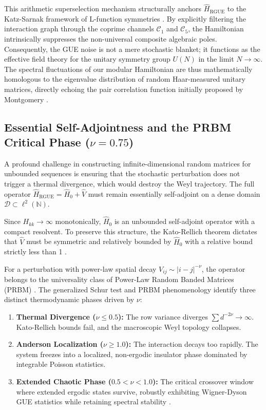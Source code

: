\documentclass[prl,aps,floatfix,superscriptaddress,10pt]{revtex4-2}
\newcommand{\N}{\mathbb{N}}
\begin{document}
This arithmetic superselection mechanism structurally anchors $\hat{H}_{\text{RGUE}}$ to the Katz-Sarnak framework of L-function symmetries \cite{KatzSarnak1999}. By explicitly filtering the interaction graph through the coprime channels $\mathcal{C}_1$ and $\mathcal{C}_5$, the Hamiltonian intrinsically suppresses the non-universal composite algebraic poles. Consequently, the GUE noise is not a mere stochastic blanket; it functions as the effective field theory for the unitary symmetry group $U(N)$ in the limit $N \to \infty$. The spectral fluctuations of our modular Hamiltonian are thus mathematically homologous to the eigenvalue distribution of random Haar-measured unitary matrices, directly echoing the pair correlation function initially proposed by Montgomery \cite{Montgomery1973}.

\subsection{Essential Self-Adjointness and the PRBM Critical Phase (\texorpdfstring{$\nu = 0.75$}{nu = 0.75})}

A profound challenge in constructing infinite-dimensional random matrices for unbounded sequences is ensuring that the stochastic perturbation does not trigger a thermal divergence, which would destroy the Weyl trajectory. The full operator $\hat{H}_{\text{RGUE}} = \hat{H}_0 + \hat{V}$ must remain essentially self-adjoint on a dense domain $\mathcal{D} \subset \ell^2(\N)$.

Since $H_{kk} \to \infty$ monotonically, $\hat{H}_0$ is an unbounded self-adjoint operator with a compact resolvent. To preserve this structure, the Kato-Rellich theorem dictates that $\hat{V}$ must be symmetric and relatively bounded by $\hat{H}_0$ with a relative bound strictly less than 1 \cite{ReedSimon1975}. 

For a perturbation with power-law spatial decay $V_{ij} \sim |i-j|^{-\nu}$, the operator belongs to the universality class of Power-Law Random Banded Matrices (PRBM) \cite{Mirlin1996}. The generalized Schur test and PRBM phenomenology identify three distinct thermodynamic phases driven by $\nu$:
\begin{enumerate}
    \item \textbf{Thermal Divergence ($\nu \le 0.5$):} The row variance diverges $\sum d^{-2\nu} \to \infty$. Kato-Rellich bounds fail, and the macroscopic Weyl topology collapses.
    \item \textbf{Anderson Localization ($\nu \ge 1.0$):} The interaction decays too rapidly. The system freezes into a localized, non-ergodic insulator phase dominated by integrable Poisson statistics.
    \item \textbf{Extended Chaotic Phase ($0.5 < \nu < 1.0$):} The critical crossover window where extended ergodic states survive, robustly exhibiting Wigner-Dyson GUE statistics while retaining spectral stability \cite{Bourgade2020}.
\end{enumerate}
\end{document}
